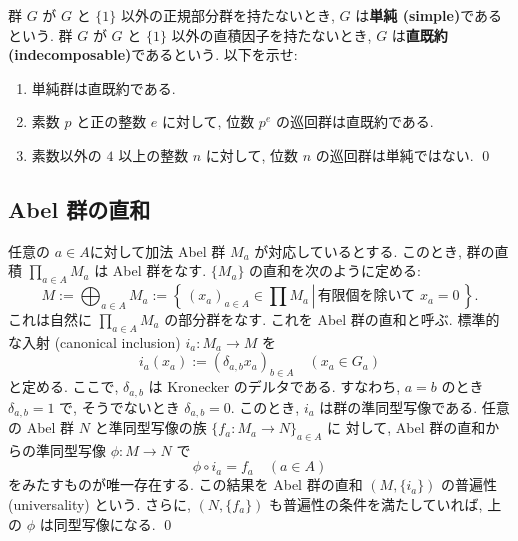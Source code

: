 \documentclass[12pt,twoside]{jarticle}
\begin{document}
\begin{question}[直既約]
  群 $G$ が $G$ と $\{1\}$ 以外の正規部分群を持たないとき,
  $G$ は{\bf 単純 (simple)}であるという.
  群 $G$ が $G$ と $\{1\}$ 以外の直積因子を持たないとき, 
  $G$ は{\bf 直既約 (indecomposable)}であるという.
  以下を示せ:
  \begin{enumerate}
  \item 単純群は直既約である.
  \item 素数 $p$ と正の整数 $e$ に対して, 位数 $p^e$ の巡回群は直既約である.
  \item 素数以外の $4$ 以上の整数 $n$ に対して, 
    位数 $n$ の巡回群は単純ではない.
    \qed
  \end{enumerate}
\end{question}


\subsection{Abel 群の直和}
\label{sec:direct-sum}

\begin{question}
  任意の $a\in A$に対して加法 Abel 群 $M_a$ が対応しているとする.
  このとき, 群の直積 $\prod_{a\in A} M_a$ は Abel 群をなす.
  $\{M_a\}$ の直和を次のように定める:
  \begin{equation*}
    M := \bigoplus_{a\in A} M_a
    := \left\{\, \left. (x_a)_{a\in A} \in \prod M_a \,\right|\,
                 \text{有限個を除いて $x_a=0$} \,\right\}.
  \end{equation*}
  これは自然に $\prod_{a\in A} M_a$ の部分群をなす.
  これを Abel 群の直和と呼ぶ.
  標準的な入射 (canonical inclusion) $i_a : M_a \to M$ を
  \begin{equation*}
    i_a(x_a) := (\delta_{a,b}x_a)_{b\in A}
    \quad (x_a\in G_a)
  \end{equation*}
  と定める. ここで, $\delta_{a,b}$ は Kronecker のデルタである. すなわち,
  $a=b$ のとき $\delta_{a,b}=1$ で, そうでないとき $\delta_{a,b}=0$.
  このとき, $i_a$ は群の準同型写像である.
  任意の Abel 群 $N$ と準同型写像の族 $\{f_a:M_a\to N\}_{a\in A}$ に
  対して, Abel 群の直和からの準同型写像 $\phi:M\to N$ で
  \begin{equation*}
    \phi\circ i_a = f_a
    \quad (a\in A)
  \end{equation*}
  をみたすものが唯一存在する. 
  この結果を Abel 群の直和 $(M, \{i_a\})$ の普遍性 (universality) という.
  さらに, $(N, \{f_a\})$ も普遍性の条件を満たしていれば,
  上の $\phi$ は同型写像になる.
 \qed
\end{question}
\end{document}

